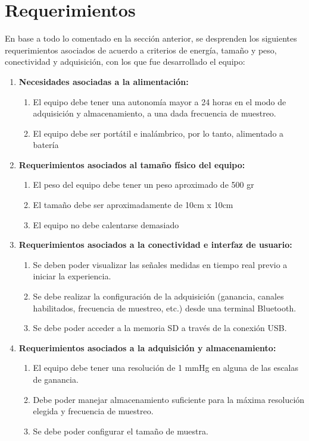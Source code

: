 \section{Requerimientos}

En base a todo lo comentado en la sección anterior, se desprenden los siguientes requerimientos asociados de acuerdo a criterios de energía, tamaño y peso, conectividad y adquisición, con los que fue desarrollado el equipo:


\begin{enumerate}
	\item \textbf{Necesidades asociadas a la alimentación:} 
	\begin{enumerate}
		\item El equipo debe tener una autonomía mayor a 24 horas en el modo de adquisición y almacenamiento, a una dada frecuencia de muestreo.
		\item El equipo debe ser portátil e inalámbrico, por lo tanto, alimentado a batería
	\end{enumerate}
	
	\item \textbf{Requerimientos asociados al tamaño físico del equipo:}
	\begin{enumerate}
		\item El peso del equipo debe tener un peso aproximado de 500 gr
		\item El tamaño debe ser aproximadamente de 10cm x 10cm
		\item El equipo no debe calentarse demasiado
	\end{enumerate}
	
	\item \textbf{Requerimientos asociados a la conectividad e interfaz de usuario:}
	
	\begin{enumerate}
		\item Se deben poder visualizar las señales medidas en tiempo real previo a iniciar la experiencia.
		\item Se debe realizar la configuración de la adquisición (ganancia, canales habilitados, frecuencia de muestreo, etc.) desde una terminal Bluetooth.
		\item Se debe poder acceder a la memoria SD a través de la conexión USB.
	\end{enumerate}


	\item \textbf{Requerimientos asociados a la adquisición y almacenamiento:}
	
	\begin{enumerate}
		\item El equipo debe tener una resolución de 1 mmHg en alguna de las escalas de ganancia.
		\item Debe poder manejar almacenamiento suficiente para la máxima resolución elegida y frecuencia de muestreo.
		\item Se debe poder configurar el tamaño de muestra.
	\end{enumerate}

\end{enumerate}


